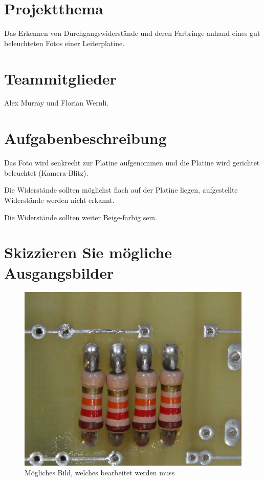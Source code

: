 \documentclass{article}
\begin{document}
\twocolumn

\section{Projektthema}

Das  Erkennen  von Durchgangswiderstände und deren Farbringe anhand eines  gut
beleuchteten Fotos einer Leiterplatine.


\section{Teammitglieder}

Alex Murray und Florian Wernli.


\section{Aufgabenbeschreibung}

Das Foto wird senkrecht zur Platine aufgenommen und die Platine wird gerichtet
beleuchtet (Kamera-Blitz).

Die Widerstände sollten  möglichst  flach auf der Platine liegen, aufgestellte
Widerstände werden nicht erkannt.

Die Widerstände sollten weiter Beige-farbig sein.


\section{Skizzieren Sie mögliche Ausgangsbilder}

\begin{figure}[H]
    \centering
    \includegraphics[width=.8\linewidth]{images/ausgangslage.png}
    \caption{M\"ogliches Bild, welches bearbeitet werden muss}
    \label{fig:ausgangslage}
\end{figure}
\end{document}
